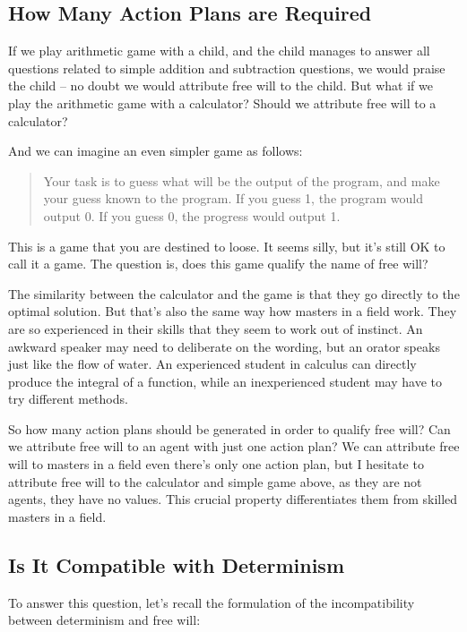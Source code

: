 \subsection{How Many Action Plans are Required}

If we play arithmetic game with a child, and the child manages to answer all questions related to simple addition and subtraction questions, we would praise the child -- no doubt we would attribute free will to the child. But what if we play the arithmetic game with a calculator? Should we attribute free will to a calculator?

And we can imagine an even simpler game as follows:

\begin{quote}
  Your task is to guess what will be the output of the program, and make your guess known to the program. If you guess 1, the program would output 0. If you guess 0, the progress would output 1.
\end{quote}

This is a game that you are destined to loose. It seems silly, but it's still OK to call it a game. The question is, does this game qualify the name of free will?

The similarity between the calculator and the game is that they go directly to the optimal solution. But that's also the same way how masters in a field work. They are so experienced in their skills that they seem to work out of instinct. An awkward speaker may need to deliberate on the wording, but an orator speaks just like the flow of water. An experienced student in calculus can directly produce the integral of a function, while an inexperienced student may have to try different methods.

So how many action plans should be generated in order to qualify free will? Can we attribute free will to an agent with just one action plan? We can attribute free will to masters in a field even there's only one action plan, but I hesitate to attribute free will to the calculator and simple game above, as they are not agents, they have no values. This crucial property differentiates them from skilled masters in a field.

\subsection{Is It Compatible with Determinism}

To answer this question, let's recall the formulation of the incompatibility between determinism and free will:

